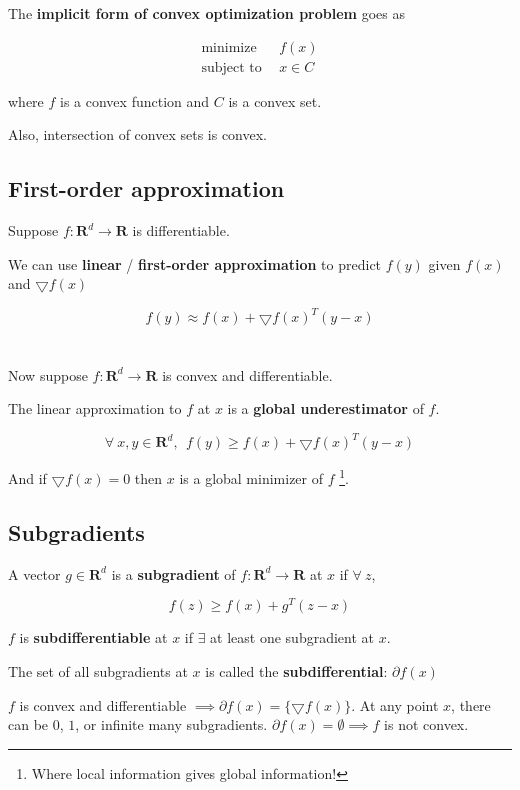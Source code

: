 \documentclass{article}
\begin{document}
The \textbf{implicit form of convex optimization problem} goes as

\begin{align*}
\text{minimize}   & ~ ~ f(x) \\
\text{subject to} & ~ ~ x \in C
\end{align*}

where $f$ is a convex function and $C$ is a convex set.

Also, intersection of convex sets is convex.

\subsection{First-order approximation}

Suppose $f : \mathbf{R}^d \to \mathbf{R}$ is differentiable.

We can use \textbf{linear} / \textbf{first-order approximation} to predict $f(y)$ given $f(x)$ and $\bigtriangledown f(x)$

$$
f(y) \approx f(x) + \bigtriangledown f(x)^{T} (y - x)
$$
\\
\\
Now suppose $f : \mathbf{R}^d \to \mathbf{R}$ is convex and differentiable.

The linear approximation to $f$ at $x$ is a \textbf{global underestimator} of $f$.

$$
\forall ~ x, y \in \mathbf{R}^d, ~ ~ f(y) \geq f(x) + \bigtriangledown f(x)^{T} (y - x)
$$

And if $\bigtriangledown f(x) = 0$ then $x$ is a global minimizer of $f$ \footnote{Where local information gives global information!}.

\subsection{Subgradients}

A vector $g \in \mathbf{R}^d$ is a \textbf{subgradient} of $f : \mathbf{R}^d \to \mathbf{R}$ at $x$ if $\forall ~ z$,

$$
f(z) \geq f(x) + g^{T} (z - x)
$$

$f$ is \textbf{subdifferentiable} at $x$ if $\exists$ at least one subgradient at $x$.

The set of all subgradients at $x$ is called the \textbf{subdifferential}: $\partial f(x)$

$f$ is convex and differentiable $\implies \partial f(x) = \{ \bigtriangledown f(x) \}$.
At any point $x$, there can be $0$, $1$, or infinite many subgradients.
$\partial f(x) = \emptyset \implies f$ is not convex.
\end{document}
